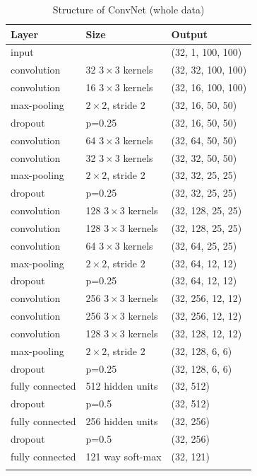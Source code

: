 \documentclass[11pt,oneside,a4paper]{article}
\numberwithin{equation}{section}
\begin{document}
\begin{table}[ht]
\centering
\caption{Structure of ConvNet (whole data)}
\begin{tabular}{lll}
\hline
Layer           & Size             & Output             \\ \hline
input           &                  & (32, 1, 100, 100)  \\
convolution     & 32 $3 \times 3$ kernels   & (32, 32, 100, 100) \\
convolution     & 16 $3 \times 3$ kernels   & (32, 16, 100, 100) \\
max-pooling     & $2 \times 2$, stride 2    & (32, 16, 50, 50)   \\
dropout         & p=0.25           & (32, 16, 50, 50)   \\
convolution     & 64 $3 \times 3$ kernels   & (32, 64, 50, 50)   \\
convolution     & 32 $3 \times 3$ kernels   & (32, 32, 50, 50)   \\
max-pooling     & $2 \times 2$, stride 2    & (32, 32, 25, 25)   \\
dropout         & p=0.25           & (32, 32, 25, 25)   \\
convolution     & 128 $3 \times 3$ kernels  & (32, 128, 25, 25)  \\
convolution     & 128 $3 \times 3$ kernels  & (32, 128, 25, 25)  \\
convolution     & 64 $3 \times 3$ kernels   & (32, 64, 25, 25)   \\
max-pooling     & $2 \times 2$, stride 2    & (32, 64, 12, 12)   \\
dropout         & p=0.25           & (32, 64, 12, 12)   \\
convolution     & 256 $3 \times 3$ kernels  & (32, 256, 12, 12)  \\
convolution     & 256 $3 \times 3$ kernels  & (32, 256, 12, 12)   \\
convolution     & 128 $3 \times 3$ kernels  & (32, 128, 12, 12)  \\
max-pooling     & $2 \times 2$, stride 2    & (32, 128, 6, 6)    \\
dropout         & p=0.25           & (32, 128, 6, 6)    \\
fully connected & 512 hidden units & (32, 512)          \\
dropout         & p=0.5            & (32, 512)          \\
fully connected & 256 hidden units & (32, 256)          \\
dropout         & p=0.5            & (32, 256)          \\
fully connected & 121 way soft-max & (32, 121)          \\ \hline
\label{complete}
\end{tabular}
\end{table}
\end{document}
